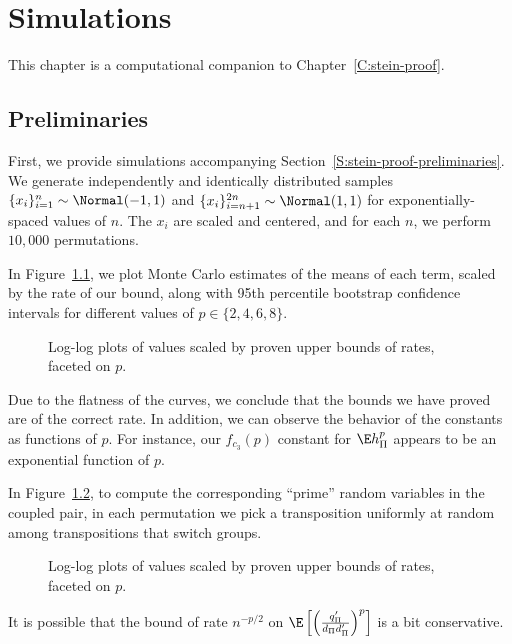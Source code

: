 \chapter{Simulations}
\label{C:simulations}
This chapter is a computational companion to Chapter~\ref{C:stein-proof}.

\section{Preliminaries}
First, we provide simulations accompanying
Section~\ref{S:stein-proof-preliminaries}.  We generate independently
and identically distributed samples $\{x_i\}_{i=1}^{n} \sim
\Normal(-1, 1)$ and $\{x_i\}_{i=n+1}^{2n} \sim \Normal(1, 1)$ for
exponentially-spaced values of $n$.  The $x_i$ are scaled and
centered, and for each $n$, we perform $10,000$ permutations.

In Figure~\ref{fig:siderates_1}, we plot Monte Carlo estimates of the
means of each term, scaled by the rate of our bound, along with
95th percentile bootstrap confidence intervals for different values of $p \in
\{2, 4, 6, 8\}$.

\begin{figure}[!ht]
  \centering
  
  \caption{Log-log plots of values scaled by proven upper bounds of
    rates, faceted on $p$.}
  \label{fig:siderates_1}
\end{figure}
Due to the flatness of the curves, we conclude that the bounds we have
proved are of the correct rate.  In addition, we can observe the
behavior of the constants as functions of $p$.  For instance, our
$f_{c_3}(p)$ constant for $\E h_{\Pi}^p$ appears to be an exponential
function of $p$.
\clearpage

In Figure~\ref{fig:siderates_2}, to compute the corresponding
``prime'' random variables in the coupled pair, in each permutation we
pick a transposition uniformly at random among transpositions that
switch groups.

\begin{figure}[!ht]
  \centering
  
  \caption{Log-log plots of values scaled by proven upper bounds of
    rates, faceted on $p$.}
  \label{fig:siderates_2}
\end{figure}
It is possible that the bound of rate $n^{-p/2}$ on
$\E \left [ \left ( \frac{q_{\Pi}'}{d_{\Pi}d_{\Pi}'} \right )^p \right ]$ is a bit conservative.
\clearpage

